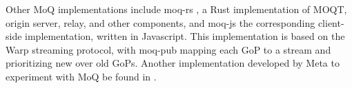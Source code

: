Other MoQ implementations include moq-rs \parencite{kixelatedKixelatedMoqrs2024}, a Rust implementation of \ac{MOQT}, origin server, relay, and other components, and moq-js \parencite{kixelatedKixelatedMoqjs2024} the corresponding client-side implementation, written in Javascript. This implementation is based on the Warp streaming protocol, with moq-pub mapping each GoP to a stream and prioritizing new over old GoPs. Another implementation developed by Meta to experiment with MoQ be found in \parencite{FacebookexperimentalMoqencoderplayer2024}.

















